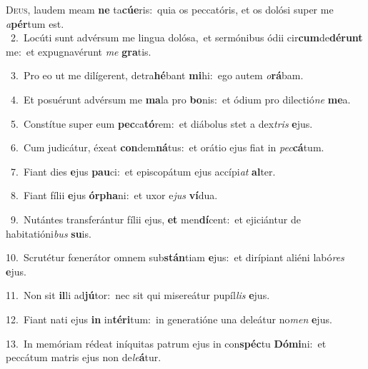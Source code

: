 \lettrine{\initial\textcolor{\initialcolor}{D}}{eus,} laudem meam \textbf{ne} ta\-\textbf{cú}\-\textbf{e}ris:~\star quia os peccatóris, et os dolósi super me \textit{a}\-\textbf{pér}tum est.\\
{\numbfont\textcolor{\numbcolor}{~2.}}~Locúti sunt advérsum me lingua dolósa,~\dagger et sermónibus ódii cir\-\textbf{cum}\-de\-\textbf{dé}\-\textbf{runt} me:~\star et expugnavérunt \textit{me} \textbf{gra}\-tis.\par
{\numbfont\textcolor{\numbcolor}{~3.}}~Pro eo ut me dilígerent, detra\-\textbf{hé}\-bant \textbf{mi}\-hi:~\star ego autem \textit{o}\-\textbf{rá}bam.\par
{\numbfont\textcolor{\numbcolor}{~4.}}~Et posuérunt advérsum me \textbf{ma}\-la pro \textbf{bo}\-nis:~\star et ódium pro dilectió\textit{ne} \textbf{me}\-a.\par
{\numbfont\textcolor{\numbcolor}{~5.}}~Constítue super eum \textbf{pec}\-ca\-\textbf{tó}\-rem:~\star et diábolus stet a dex\textit{tris} \textbf{e}\-jus.\par
{\numbfont\textcolor{\numbcolor}{~6.}}~Cum judicátur, éxeat \textbf{con}\-dem\-\textbf{ná}\-tus:~\star et orátio ejus fiat in \textit{pec}\-\textbf{cá}tum.\par
{\numbfont\textcolor{\numbcolor}{~7.}}~Fiant dies \textbf{e}\-jus \textbf{pau}\-ci:~\star et episcopátum ejus accípi\textit{at} \textbf{al}\-ter.\par
{\numbfont\textcolor{\numbcolor}{~8.}}~Fiant fílii \textbf{e}\-jus \textbf{ór}\-\textbf{pha}ni:~\star et uxor e\textit{jus} \textbf{ví}\-dua.\par
{\numbfont\textcolor{\numbcolor}{~9.}}~Nutántes transferántur fílii ejus, \textbf{et} men\-\textbf{dí}\-cent:~\star et ejiciántur de habitatióni\textit{bus} \textbf{su}\-is.\par
{\numbfont\textcolor{\numbcolor}{10.}}~Scrutétur fœnerátor omnem sub\-\textbf{stán}\-tiam \textbf{e}\-jus:~\star et dirípiant aliéni labó\textit{res} \textbf{e}\-jus.\par
{\numbfont\textcolor{\numbcolor}{11.}}~Non sit \textbf{il}\-li ad\-\textbf{jú}\-tor:~\star nec sit qui misereátur pupíl\textit{lis} \textbf{e}\-jus.\par
{\numbfont\textcolor{\numbcolor}{12.}}~Fiant nati ejus \textbf{in} in\-\textbf{tér}\-\textbf{i}tum:~\star in generatióne una deleátur no\textit{men} \textbf{e}\-jus.\par
{\numbfont\textcolor{\numbcolor}{13.}}~In memóriam rédeat iníquitas patrum ejus in con\-\textbf{spéc}\-tu \textbf{Dó}\-\textbf{mi}ni:~\star et peccátum matris ejus non de\-\textit{le}\-\textbf{á}tur.\par
